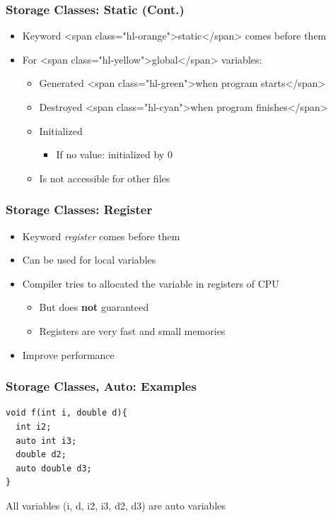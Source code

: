 \documentclass{../c-lecture}
\begin{document}
\begin{frame}
  \frametitle{Storage Classes: Static (Cont.)}
  \begin{itemize}
    \item Keyword <span class="hl-orange">static</span> comes before them
    \item For <span class="hl-yellow">global</span> variables:
    \begin{itemize}
      \item Generated <span class="hl-green">when program starts</span>
      \item Destroyed <span class="hl-cyan">when program finishes</span>
      \item Initialized
      \begin{itemize}
        \item If no value: initialized by 0
      \end{itemize}
      \item Is not accessible for other files
    \end{itemize}
  \end{itemize}
\end{frame}

\begin{frame}
  \frametitle{Storage Classes: Register}
  \begin{itemize}
    \item Keyword \textit{\color{Orange} register} comes before them
    \item Can be used for local variables
    \item Compiler tries to allocated the variable in registers of CPU
    \begin{itemize}
      \item But does \textbf{\color{RubineRed} not} guaranteed
      \item Registers are very fast and small memories
    \end{itemize}
    \item Improve performance
  \end{itemize}
\end{frame}

\begin{frame}[fragile]
  \frametitle{Storage Classes, Auto: Examples}
  \begin{verbatim}
void f(int i, double d){
  int i2;
  auto int i3;
  double d2;
  auto double d3;
}
  \end{verbatim}
  \begin{block}{}
    All variables (i, d, i2, i3, d2, d3) are auto variables
  \end{block}
\end{frame}
\end{document}
